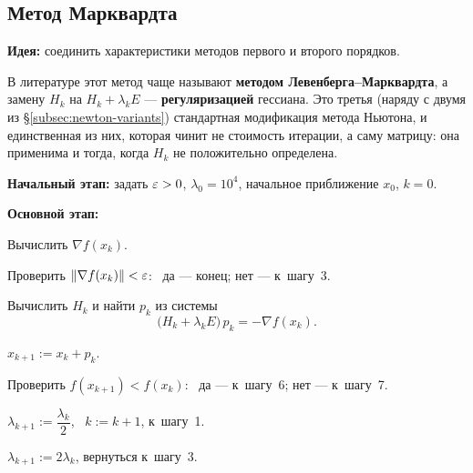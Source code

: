 \subsection{Метод Марквардта}
\label{subsec:marquardt}

\textbf{Идея:} соединить характеристики методов первого и второго порядков.

\begin{idea}
В литературе этот метод чаще называют \textbf{методом
Левенберга--Марквардта}, а замену $H_k$ на $H_k + \lambda_k E$ —
\textbf{регуляризацией} гессиана. Это третья (наряду с двумя из
\S\ref{subsec:newton-variants}) стандартная модификация метода Ньютона, и
единственная из них, которая чинит не стоимость итерации, а саму матрицу: она
применима и тогда, когда $H_k$ не положительно определена.
\end{idea}

\begin{algo}[title={Метод Марквардта}]
\textbf{Начальный этап:} задать $\varepsilon > 0$, $\lambda_0 = 10^4$, начальное
приближение $x_0$, $k = 0$.

\medskip
\textbf{Основной этап:}
\begin{steps}
  \item Вычислить $\nabla f(x_k)$.
  \item Проверить $\left\lVert \nabla f(x_k) \right\rVert < \varepsilon$: \ да — конец; нет — к~шагу~3.
  \item Вычислить $H_k$ и найти $p_k$ из системы
        \[
          \big(H_k + \lambda_k E\big)\, p_k = -\nabla f(x_k) .
        \]
  \item $x_{k+1} := x_k + p_k$.
  \item Проверить $f(x_{k+1}) < f(x_k)$: \ да — к~шагу~6; нет — к~шагу~7.
  \item $\lambda_{k+1} := \dfrac{\lambda_k}{2}$, \ $k := k+1$, к~шагу~1.
  \item $\lambda_{k+1} := 2\lambda_k$, вернуться к~шагу~3.
\end{steps}
\end{algo}

